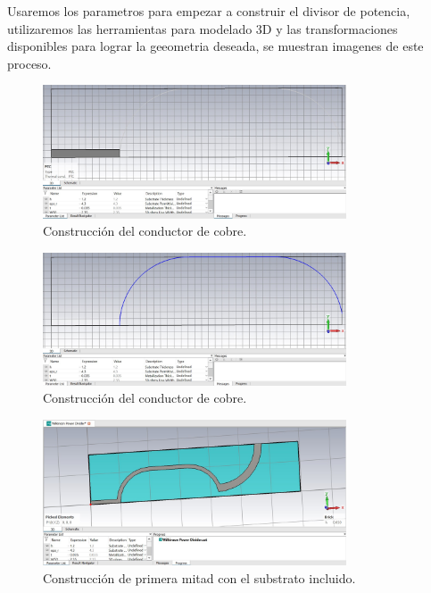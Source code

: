 \documentclass[a4paper]{IEEEtran} %
\begin{document}
Usaremos los parametros para empezar a construir el divisor de potencia, utilizaremos las herramientas para modelado 3D y las transformaciones disponibles para lograr la geeometria deseada, se muestran imagenes de este proceso.

\begin{figure}[h]    
    \centering
        \includegraphics[width=9cm]{imagenes/img6}
        \caption{Construcción del conductor de cobre.}
        \label{fig:modelamiento1}
\end{figure} 
\vspace{50mm}
\begin{figure}[h]    
    \centering
        \includegraphics[width=9cm]{imagenes/img7}
        \caption{Construcción del conductor de cobre.}
        \label{fig:modelamiento2}
\end{figure} 
\begin{figure}[h]    
    \centering
        \includegraphics[width=9cm]{imagenes/img8}
        \caption{Construcción de primera mitad con el substrato incluido.}
        \label{fig:modelamiento3}
\end{figure} 
\end{document}
